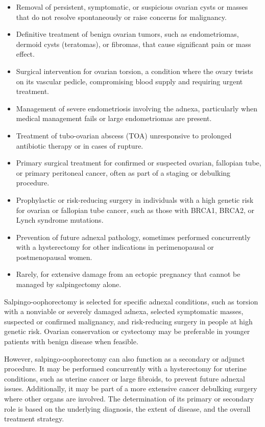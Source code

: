 \begin{itemize}
  \item Removal of persistent, symptomatic, or suspicious ovarian cysts or masses that do not resolve spontaneously or raise concerns for malignancy.
  \item Definitive treatment of benign ovarian tumors, such as endometriomas, dermoid cysts (teratomas), or fibromas, that cause significant pain or mass effect.
  \item Surgical intervention for ovarian torsion, a condition where the ovary twists on its vascular pedicle, compromising blood supply and requiring urgent treatment.
  \item Management of severe endometriosis involving the adnexa, particularly when medical management fails or large endometriomas are present.
  \item Treatment of tubo-ovarian abscess (TOA) unresponsive to prolonged antibiotic therapy or in cases of rupture.
  \item Primary surgical treatment for confirmed or suspected ovarian, fallopian tube, or primary peritoneal cancer, often as part of a staging or debulking procedure.
  \item Prophylactic or risk-reducing surgery in individuals with a high genetic risk for ovarian or fallopian tube cancer, such as those with BRCA1, BRCA2, or Lynch syndrome mutations.
  \item Prevention of future adnexal pathology, sometimes performed concurrently with a hysterectomy for other indications in perimenopausal or postmenopausal women.
  \item Rarely, for extensive damage from an ectopic pregnancy that cannot be managed by salpingectomy alone.
\end{itemize}

Salpingo-oophorectomy is selected for specific adnexal conditions, such as torsion with a nonviable or severely damaged adnexa, selected symptomatic masses, suspected or confirmed malignancy, and risk-reducing surgery in people at high genetic risk. Ovarian conservation or cystectomy may be preferable in younger patients with benign disease when feasible.

However, salpingo-oophorectomy can also function as a secondary or adjunct procedure. It may be performed concurrently with a hysterectomy for uterine conditions, such as uterine cancer or large fibroids, to prevent future adnexal issues. Additionally, it may be part of a more extensive cancer debulking surgery where other organs are involved. The determination of its primary or secondary role is based on the underlying diagnosis, the extent of disease, and the overall treatment strategy.

